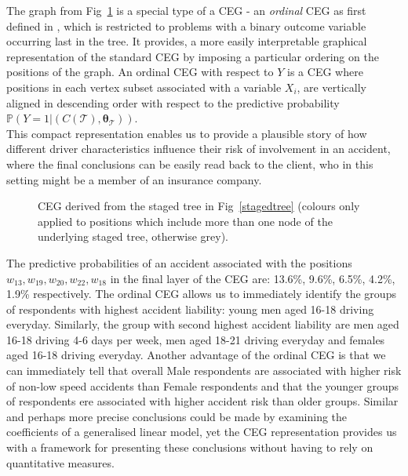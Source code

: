 \documentclass[runningheads]{llncs}
\begin{document}
The graph from Fig~\ref{ceg:freq-acc} is a special type of a CEG - an \emph{ordinal} CEG as first defined in \cite{barclay2014missingness}, which is restricted to problems with a binary outcome variable occurring last in the tree. It provides, a more easily interpretable graphical representation of the standard CEG by imposing a particular ordering on the positions of the graph. An ordinal CEG with respect to $Y$ is a CEG where positions in each vertex subset associated with a variable $X_i$, are vertically aligned in descending order with respect to the predictive probability $\mathbb{P}(Y = 1|(C(\mathcal{T}) , \boldsymbol{\theta}_{\mathcal{T}}))$. \\
This compact representation enables us to provide a plausible story of how different driver characteristics influence their risk of involvement in an accident, where the final conclusions can be easily read back to the client, who in this setting might be a member of an insurance company. 
\begin{figure}
\centering

\caption{CEG derived from the staged tree in Fig~\ref{stagedtree} (colours only applied to positions which include more than one node of the underlying staged tree, otherwise grey).}
\label{ceg:freq-acc}
\end{figure}
The predictive probabilities of an accident associated with the positions $w_{13}, w_{19}, w_{20}, w_{22}, w_{18}$ in the final layer of the CEG are: 13.6\%, 9.6\%, 6.5\%, 4.2\%, 1.9\% respectively.
The ordinal CEG allows us to immediately identify the groups of respondents with highest accident liability: young men aged 16-18 driving everyday. Similarly, the group with second highest accident liability are men aged 16-18 driving 4-6 days per week, men aged 18-21 driving everyday and females aged 16-18 driving everyday. Another advantage of the ordinal CEG is that we can immediately tell that overall Male respondents are associated with higher risk of non-low speed accidents than Female respondents and that the younger groups of respondents ere associated with higher accident risk than older groups. Similar and perhaps more precise conclusions could be made by examining the coefficients of a generalised linear model, yet the CEG representation provides us with a framework for presenting these conclusions without having to rely on quantitative measures. 
\end{document}
